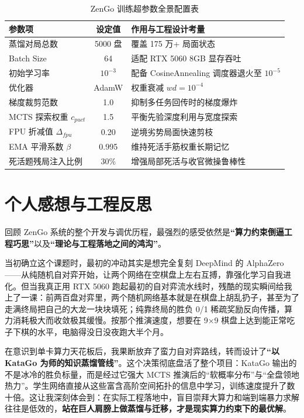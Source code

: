 \documentclass[11pt,a4paper]{ctexart}
\begin{document}
\begin{table}[H]
\centering\small
\caption{ZenGo 训练超参数全景配置表}
\begin{tabular}{lcl}
\toprule
\textbf{参数项} & \textbf{设定值} & \textbf{作用与工程设计考量} \\
\midrule
蒸馏对局总数 & 5000 盘 & 覆盖 175 万+ 局面状态 \\
Batch Size & 64 & 适配 RTX 5060 8GB 显存吞吐 \\
初始学习率 & $10^{-3}$ & 配备 CosineAnnealing 调度器退火至 $10^{-5}$ \\
优化器 & AdamW & 权重衰减 $wd = 10^{-4}$ \\
梯度裁剪范数 & 1.0 & 抑制多任务回传时的梯度爆炸 \\
MCTS 探索权重 $c_{puct}$ & 1.5 & 平衡先验深度利用与宽度探索 \\
FPU 折减值 $\Delta_{fpu}$ & 0.20 & 逆境劣势局面快速剪枝 \\
EMA 平滑系数 $\beta$ & 0.995 & 维持死活手筋权重长期记忆 \\
死活题残局注入比例 & 30\% & 增强局部死活与收官微操鲁棒性 \\
\bottomrule
\end{tabular}
\end{table}

\section*{个人感想与工程反思}

回顾 ZenGo 系统的整个开发与调优历程，最强烈的感受依然是\textbf{“算力约束倒逼工程巧思”}以及\textbf{“理论与工程落地之间的鸿沟”}。

当初确立这个课题时，最初的冲动其实是想完全复刻 DeepMind 的 AlphaZero——从纯随机自对弈开始，让两个网络在空棋盘上左右互搏，靠强化学习自我进化。但当我真正用 RTX 5060 跑起最初的自对弈流水线时，残酷的现实瞬间给我上了一课：前两百盘对弈里，两个随机网络基本就是在棋盘上胡乱扔子，甚至为了走满终局把自己的大龙一块块填死；纯靠终局的胜负 0/1 稀疏奖励反向传播，算力消耗极大而收敛极其缓慢。按那个推演速度，想要在 9×9 棋盘上达到能正常吃子下棋的水平，电脑得没日没夜跑大半个月。

在意识到单卡算力天花板后，我果断放弃了蛮力自对弈路线，转而设计了\textbf{“以 KataGo 为师的知识蒸馏管线”}。这个决策彻底盘活了整个项目：KataGo 输出的不是冰冷的胜负标量，而是经过它强大 MCTS 推演后的“软概率分布”与“全盘领地热力”。学生网络直接从这些富含高阶空间拓扑的信息中学习，训练速度提升了数十倍。这让我深刻体会到：在实际工程落地中，盲目崇拜大算力和端到端暴力求解往往是低效的，\textbf{站在巨人肩膀上做蒸馏与迁移，才是现实算力约束下的最优解}。
\end{document}
